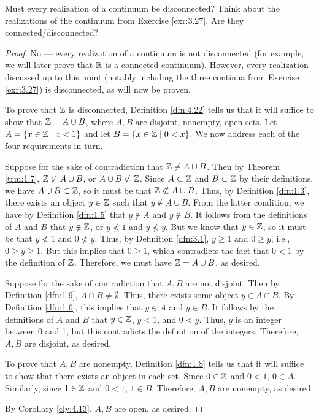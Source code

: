 \documentclass[../main.tex]{subfiles}
\begin{document}
\begin{exercise}\label{exr:4.24}
    Must every realization of a continuum be disconnected? Think about the realizations of the continuum from Exercise \ref{exr:3.27}. Are they connected/disconnected?
    \begin{proof}
        No --- every realization of a continuum is not disconnected (for example, we will later prove that $\mathbb{R}$ is a connected continuum). However, every realization discussed up to this point (notably including the three continua from Exercise \ref{exr:3.27}) is disconnected, as will now be proven.\par\medskip

        To prove that $\mathbb{Z}$ is disconnected, Definition \ref{dfn:4.22} tells us that it will suffice to show that $\mathbb{Z}=A\cup B$, where $A,B$ are disjoint, nonempty, open sets. Let $A=\{x\in\mathbb{Z}\mid x<1\}$ and let $B=\{x\in\mathbb{Z}\mid 0<x\}$. We now address each of the four requirements in turn.\par
        Suppose for the sake of contradiction that $\mathbb{Z}\neq A\cup B$. Then by Theorem \ref{trm:1.7}, $\mathbb{Z}\not\subset A\cup B$, or $A\cup B\not\subset\mathbb{Z}$. Since $A\subset\mathbb{Z}$ and $B\subset\mathbb{Z}$ by their definitions, we have $A\cup B\subset\mathbb{Z}$, so it must be that $\mathbb{Z}\not\subset A\cup B$. Thus, by Definition \ref{dfn:1.3}, there exists an object $y\in\mathbb{Z}$ such that $y\notin A\cup B$. From the latter condition, we have by Definition \ref{dfn:1.5} that $y\notin A$ and $y\notin B$. It follows from the definitions of $A$ and $B$ that $y\notin\mathbb{Z}$, or $y\not<1$ and $y\not<y$. But we know that $y\in\mathbb{Z}$, so it must be that $y\not<1$ and $0\not<y$. Thus, by Definition \ref{dfn:3.1}, $y\geq 1$ and $0\geq y$, i.e., $0\geq y\geq 1$. But this implies that $0\geq 1$, which contradicts the fact that $0<1$ by the definition of $\mathbb{Z}$. Therefore, we must have $\mathbb{Z}=A\cup B$, as desired.\par
        Suppose for the sake of contradiction that $A,B$ are not disjoint. Then by Definition \ref{dfn:1.9}, $A\cap B\neq\emptyset$. Thus, there exists some object $y\in A\cap B$. By Definition \ref{dfn:1.6}, this implies that $y\in A$ and $y\in B$. It follows by the definitions of $A$ and $B$ that $y\in\mathbb{Z}$, $y<1$, and $0<y$. Thus, $y$ is an integer between 0 and 1, but this contradicts the definition of the integers. Therefore, $A,B$ are disjoint, as desired.\par
        To prove that $A,B$ are nonempty, Definition \ref{dfn:1.8} tells us that it will suffice to show that there exists an object in each set. Since $0\in\mathbb{Z}$ and $0<1$, $0\in A$. Similarly, since $1\in\mathbb{Z}$ and $0<1$, $1\in B$. Therefore, $A,B$ are nonempty, as desired.\par
        By Corollary \ref{cly:4.13}, $A,B$ are open, as desired.\par\medskip


\end{proof}
\end{exercise}
\end{document}
